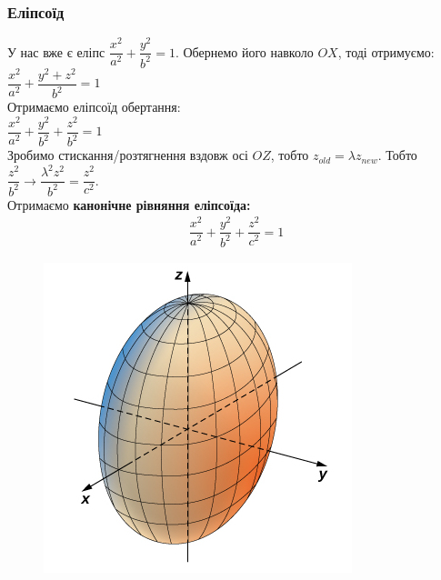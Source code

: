\documentclass[a4paper, 10pt]{extarticle}
\theoremstyle{theoremdd}
\theoremstyle{theoremdd}
\theoremstyle{theoremdd}
\theoremstyle{theoremdd}
\theoremstyle{theoremdd}
\theoremstyle{theoremdd}
\theoremstyle{theoremdd}
\theoremstyle{theoremdd}
\begin{document}
\subsubsection{Еліпсоїд}
У нас вже є еліпс $\dfrac{x^2}{a^2} + \dfrac{y^2}{b^2} = 1$. Обернемо його навколо $OX$, тоді отримуємо:\\
$\dfrac{x^2}{a^2} + \dfrac{y^2+z^2}{b^2} = 1$\\
Отримаємо еліпсоїд обертання:\\
$\dfrac{x^2}{a^2} + \dfrac{y^2}{b^2} + \dfrac{z^2}{b^2} = 1$\\
Зробимо стискання/розтягнення вздовж осі $OZ$, тобто $z_{old} = \lambda z_{new}$. Тобто $\dfrac{z^2}{b^2} \to \dfrac{\lambda^2 z^2}{b^2} = \dfrac{z^2}{c^2}$.\\
Отримаємо \textbf{канонічне рівняння еліпсоїда:}
\begin{align*}
\dfrac{x^2}{a^2} + \dfrac{y^2}{b^2} + \dfrac{z^2}{c^2} = 1
\end{align*}
\begin{figure}[H]
\centering
\includegraphics[scale=1]{ellipsoid.jpeg}
\end{figure}
%
\end{document}
